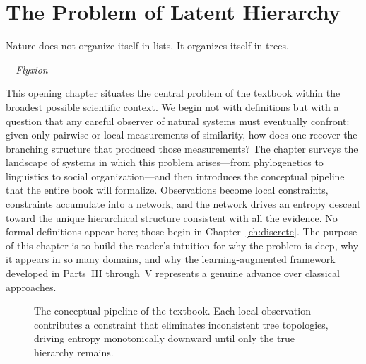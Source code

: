 \chapter{The Problem of Latent Hierarchy}
\label{ch:orientation}

\epigraph{%
  Nature does not organize itself in lists.
  It organizes itself in trees.%
}{\textit{---Flyxion}}

This opening chapter situates the central problem of the textbook within the broadest possible scientific context. We begin not with definitions but with a question that any careful observer of natural systems must eventually confront: given only pairwise or local measurements of similarity, how does one recover the branching structure that produced those measurements? The chapter surveys the landscape of systems in which this problem arises---from phylogenetics to linguistics to social organization---and then introduces the conceptual pipeline that the entire book will formalize. Observations become local constraints, constraints accumulate into a network, and the network drives an entropy descent toward the unique hierarchical structure consistent with all the evidence. No formal definitions appear here; those begin in Chapter~\ref{ch:discrete}. The purpose of this chapter is to build the reader's intuition for why the problem is deep, why it appears in so many domains, and why the learning-augmented framework developed in Parts~III through~V represents a genuine advance over classical approaches.

\begin{figure}[ht]
\centering
{}
\caption{The conceptual pipeline of the textbook. Each local observation
 contributes a constraint that eliminates inconsistent tree topologies,
 driving entropy monotonically downward until only the true hierarchy remains.}
\label{fig:pipeline}
\end{figure}

